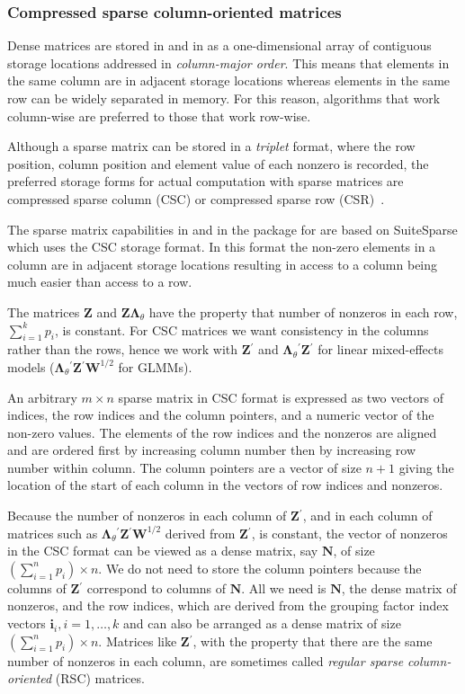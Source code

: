 \documentclass{jss}
\newcommand{\bLt}{\ensuremath{\bm\Lambda_\theta}}
\newcommand{\trans}{\ensuremath{^\prime}}
\begin{document}
\subsubsection{Compressed sparse column-oriented matrices}
\label{sec:CSCmats}

Dense matrices are stored in  and in  as a
one-dimensional array of contiguous storage locations addressed in
\emph{column-major order}.  This means that elements in the same
column are in adjacent storage locations whereas elements in the same
row can be widely separated in memory.  For this reason, algorithms
that work column-wise are preferred to those that work row-wise.

Although a sparse matrix can be stored in a \emph{triplet} format,
where the row position, column position and element value of each
nonzero is recorded, the preferred storage forms for actual
computation with sparse matrices are compressed sparse column (CSC) or
compressed sparse row (CSR)~\citep[Ch.~2]{davis06:csparse_book}.

The sparse matrix capabilities in  and in the
 package for  are based on SuiteSparse %
which uses the CSC storage format.  In this format the non-zero
elements in a column are in adjacent storage locations resulting in
access to a column being much easier than access to a row.

The matrices $\bm Z$ and $\bm Z\bLt$ have the property that number of
nonzeros in each row, $\sum_{i=1}^k p_i$, is constant.  For CSC
matrices we want consistency in the columns rather than the rows,
hence we work with $\bm Z\trans$ and $\bLt\trans\bm Z\trans$ for
linear mixed-effects models ($\bLt\trans\bm Z\trans\bm W^{1/2}$ for
GLMMs).

An arbitrary $m\times n$ sparse matrix in CSC format is expressed as
two vectors of indices, the row indices and the column pointers, and a
numeric vector of the non-zero values.  The elements of the row
indices and the nonzeros are aligned and are ordered first by
increasing column number then by increasing row number within column.
The column pointers are a vector of size $n+1$ giving the location of
the start of each column in the vectors of row indices and nonzeros.

Because the number of nonzeros in each column of $\bm Z\trans$, and in
each column of matrices such as $\bLt\trans\bm Z\trans\bm W^{1/2}$
derived from $\bm Z\trans$, is constant, the vector of nonzeros in the
CSC format can be viewed as a dense matrix, say $\bm N$, of size
$\left(\sum_{i=1}^n p_i\right)\times n$.  We do not need to store the
column pointers because the columns of $\bm Z\trans$ correspond to
columns of $\bm N$.  All we need is $\bm N$, the dense matrix of
nonzeros, and the row indices, which are derived from the grouping
factor index vectors $\bm i_i,i=1,\dots,k$ and can also be arranged as
a dense matrix of size $\left(\sum_{i=1}^n p_i\right)\times n$.
Matrices like $\bm Z\trans$, with the property that there are the same
number of nonzeros in each column, are sometimes called \emph{regular
  sparse column-oriented} (RSC) matrices.
\end{document}

